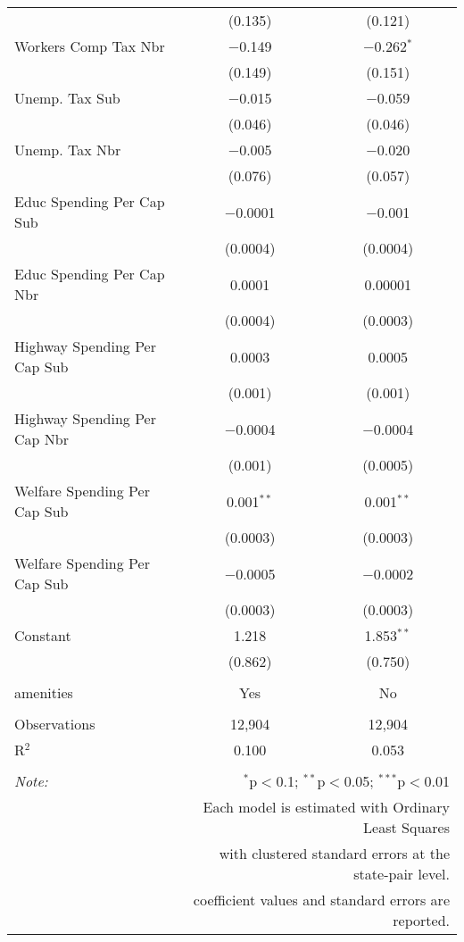 \begin{table}[!htbp]
\begin{tabular}{@{\extracolsep{5pt}}lcc}
  & (0.135) & (0.121) \\ 
  Workers Comp Tax Nbr & $-$0.149 & $-$0.262$^{*}$ \\ 
  & (0.149) & (0.151) \\ 
  Unemp. Tax Sub & $-$0.015 & $-$0.059 \\ 
  & (0.046) & (0.046) \\ 
  Unemp. Tax Nbr & $-$0.005 & $-$0.020 \\ 
  & (0.076) & (0.057) \\ 
  Educ Spending Per Cap Sub & $-$0.0001 & $-$0.001 \\ 
  & (0.0004) & (0.0004) \\ 
  Educ Spending Per Cap Nbr & 0.0001 & 0.00001 \\ 
  & (0.0004) & (0.0003) \\ 
  Highway Spending Per Cap Sub & 0.0003 & 0.0005 \\ 
  & (0.001) & (0.001) \\ 
  Highway Spending Per Cap Nbr & $-$0.0004 & $-$0.0004 \\ 
  & (0.001) & (0.0005) \\ 
  Welfare Spending Per Cap Sub & 0.001$^{**}$ & 0.001$^{**}$ \\ 
  & (0.0003) & (0.0003) \\ 
  Welfare Spending Per Cap Sub & $-$0.0005 & $-$0.0002 \\ 
  & (0.0003) & (0.0003) \\ 
  Constant & 1.218 & 1.853$^{**}$ \\ 
  & (0.862) & (0.750) \\ 
 \hline \\[-1.8ex] 
amenities & Yes & No \\ 
\hline \\[-1.8ex] 
Observations & 12,904 & 12,904 \\ 
R$^{2}$ & 0.100 & 0.053 \\ 
\hline 
\hline \\[-1.8ex] 
\textit{Note:}  & \multicolumn{2}{r}{$^{*}$p$<$0.1; $^{**}$p$<$0.05; $^{***}$p$<$0.01} \\ 
 & \multicolumn{2}{r}{Each model is estimated with Ordinary Least Squares} \\ 
 & \multicolumn{2}{r}{with clustered standard errors at the state-pair level.} \\ 
 & \multicolumn{2}{r}{coefficient values and standard errors are reported.} \\ 
\end{tabular} 
\end{table} 
